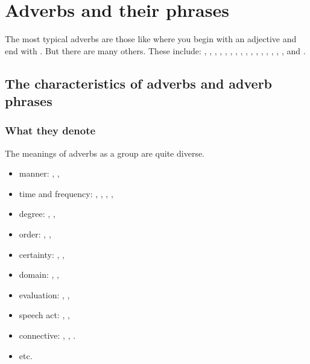 \section{Adverbs and their phrases}
The most typical adverbs are those like  where you begin with an adjective and end with . But there are many others. These include: , , , , , , , , , , , , , , , , and .

\subsection{The characteristics of adverbs and adverb phrases}

\subsubsection*{What they denote}

The meanings of adverbs as a group are quite diverse.

\begin{itemize}[noitemsep]
   \item manner: , , 
   \item time and frequency: , , , , 
   \item degree: , , 
   \item order: , , 
   \item certainty: , , 
   \item domain: , , 
   \item evaluation: , , 
   \item speech act: , , 
   \item connective: , , .
   \item etc.
\end{itemize}

